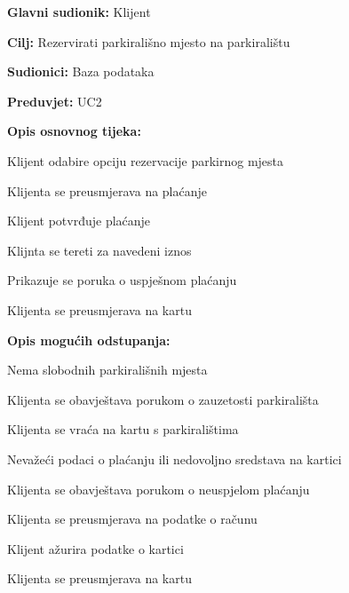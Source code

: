 \noindent {}
\begin{packed_item}
	
	\item \textbf{Glavni sudionik:} Klijent
	\item  \textbf{Cilj:} Rezervirati parkirališno mjesto na parkiralištu
	\item  \textbf{Sudionici:} Baza podataka
	\item  \textbf{Preduvjet:} UC2
	\item  \textbf{Opis osnovnog tijeka:}
	
	\item[] \begin{packed_enum}
		
		\item Klijent odabire opciju rezervacije parkirnog mjesta
		\item Klijenta se preusmjerava na plaćanje
		\item Klijent potvrđuje plaćanje
		\item Klijnta se tereti za navedeni iznos
		\item Prikazuje se poruka o uspješnom plaćanju
		\item Klijenta se preusmjerava na kartu
		
	\item  \textbf{Opis mogućih odstupanja:}
	
	\item[] \begin{packed_item}
		
		\item[1.a] Nema slobodnih parkirališnih mjesta
		\item[] \begin{packed_enum}
			
			\item Klijenta se obavještava porukom o zauzetosti parkirališta
			\item Klijenta se vraća na kartu s parkiralištima
			
		\end{packed_enum}
		
		\item[3.a] Nevažeći podaci o plaćanju ili nedovoljno sredstava na kartici
		\item[] \begin{packed_enum}
			
			\item Klijenta se obavještava porukom o neuspjelom plaćanju
			\item Klijenta se preusmjerava na podatke o računu
			\item Klijent ažurira podatke o kartici
			\item Klijenta se preusmjerava na kartu
			
		\end{packed_enum}
		
	\end{packed_item}
		
	\end{packed_enum}
\end{packed_item}

